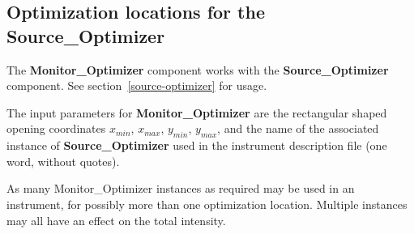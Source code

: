 
\subsection*{Optimization locations for the
  Source\_Optimizer}
\label{monitor-optimizer}

The \textbf{Monitor\_Optimizer} component works with the \textbf{
  Source\_Optimizer} component. See section~\ref{source-optimizer}
for usage.

The input parameters for \textbf{Monitor\_Optimizer} are the rectangular
shaped opening coordinates $x_{min}$, $x_{max}$, $y_{min}$,
$y_{max}$, and the name of the associated instance of
\textbf{Source\_Optimizer} used in the instrument description file (one word,
without quotes).

As many Monitor\_Optimizer instances as required may be used in an instrument, 
for possibly more than one optimization location. 
Multiple instances may all have an effect on the total intensity.
